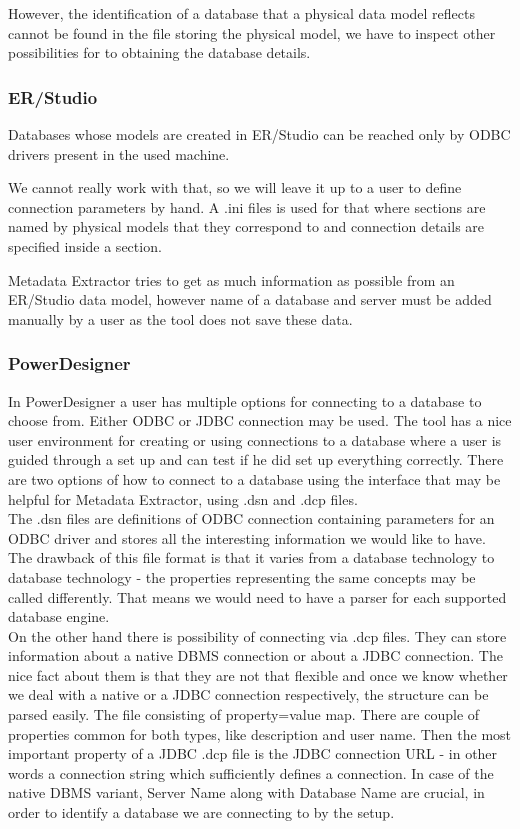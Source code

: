 However, the identification of a database that a physical data model reflects cannot be found in the file storing the physical model, we have to inspect other possibilities for to obtaining the database details.

\subsubsection{ER/Studio}

Databases whose models are created in ER/Studio can be reached only by ODBC drivers present in the used machine.

We cannot really work with that, so we will leave it up to a user to define connection parameters by hand.
A .ini files \label{ini_connections}is used for that where sections are named by physical models that they correspond to and connection details are specified inside a section. 

Metadata Extractor tries to get as much information as possible from an ER/Studio data model, however name of a database and server must be added manually by a user as the tool does not save these data.

\subsubsection{PowerDesigner}

In PowerDesigner a user has multiple options for connecting to a database to choose from. Either ODBC or JDBC connection may be used. 
The tool has a nice user environment for creating or using connections to a database where a user is guided through a set up and can test if he did set up everything correctly. 
There are two options of how to connect to a database using the interface that may be helpful for Metadata Extractor, using .dsn and .dcp files.\\

The .dsn files are definitions of ODBC connection containing parameters for an ODBC driver and stores all the interesting information we would like to have. 
The drawback of this file format is that it varies from a database technology to database technology - the properties representing the same concepts may be called differently. That means we would need to have a parser for each supported database engine. \\

On the other hand there is possibility of connecting via .dcp files. They can store information about a native DBMS connection or about a JDBC connection. 
The nice fact about them is that they are not that flexible and once we know whether we deal with a native or a JDBC connection respectively, the structure can be parsed easily. 
The file consisting of property=value map.
There are couple of properties common for both types, like description and user name.
Then the most important property of a JDBC .dcp file is the JDBC connection URL - in other words a connection string which sufficiently defines a connection.
In case of the native DBMS variant, Server Name along with Database Name are crucial, in order to identify a database we are connecting to by the setup.

